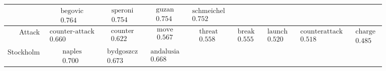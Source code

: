\documentclass[10pt, a4paper]{UUThesisTemplate}
\begin{document}
\begin{table}[hb]
\begin{tabular}{r|c c c c c c c c}
 & $\begin{matrix}\text{begovic}\\0.764\end{matrix}$
 & $\begin{matrix}\text{speroni}\\0.754\end{matrix}$
 & $\begin{matrix}\text{guzan}\\0.754\end{matrix}$
 & $\begin{matrix}\text{schmeichel}\\0.752\end{matrix}$
 \\\hline
Attack
 & $\begin{matrix}\text{counter-attack}\\0.660\end{matrix}$
 & $\begin{matrix}\text{counter}\\0.622\end{matrix}$
 & $\begin{matrix}\text{move}\\0.567\end{matrix}$
 & $\begin{matrix}\text{threat}\\0.558\end{matrix}$
 & $\begin{matrix}\text{break}\\0.555\end{matrix}$
 & $\begin{matrix}\text{launch}\\0.520\end{matrix}$
 & $\begin{matrix}\text{counterattack}\\0.518\end{matrix}$
 & $\begin{matrix}\text{charge}\\0.485\end{matrix}$
 \\\hline
Stockholm
 & $\begin{matrix}\text{naples}\\0.700\end{matrix}$
 & $\begin{matrix}\text{bydgoszcz}\\0.673\end{matrix}$
 & $\begin{matrix}\text{andalusia}\\0.668\end{matrix}$

\end{tabular}
\end{table}
\end{document}

